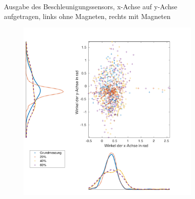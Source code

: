 \begin{figure}[tb]
\begin{adjustwidth}{-0.2\linewidth}{-0.2\linewidth}
\begin{subfigure}[c]{.45\linewidth}
		\vspace{5pt}
	\end{subfigure}
	\end{adjustwidth}
	\caption{Ausgabe des Beschleunigungssensors, x-Achse auf y-Achse aufgetragen, links ohne Magneten, rechts mit Magneten} \label{Acc}
\end{figure}
\begin{figure}[tb]
	\centering
	\begin{adjustwidth}{-0.2\linewidth}{-0.2\linewidth}
		\hspace{5pt}
		\begin{subfigure}[c]{.45\linewidth}
			\centering
			\includegraphics[width=\linewidth]{Bilder/Winkel_Grund_20_40_60_ohneM.pdf}
			\vspace{5pt}
		\end{subfigure}
		\hspace{20pt}
		\begin{subfigure}[c]{.45\linewidth}
			\centering

\end{subfigure}
\end{adjustwidth}
\end{figure}
